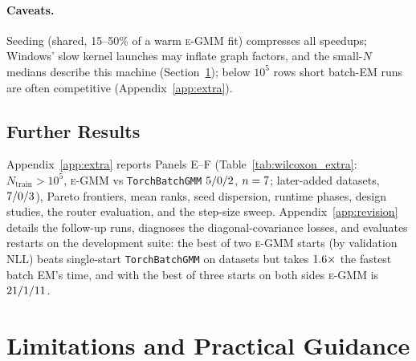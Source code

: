 \documentclass[10pt]{article} %
\newcommand{\egmm}{\textsc{e-GMM}}
\begin{document}
\paragraph{Caveats.} Seeding (shared, 15--50\% of a warm \egmm{} fit) compresses all speedups; Windows' slow kernel launches may inflate graph factors, and the small-$N$ medians describe this machine (Section~\ref{sec:limitations}); below $10^5$ rows short batch-EM runs are often competitive (Appendix~\ref{app:extra}).

\subsection{Further Results}

Appendix~\ref{app:extra} reports Panels E--F (Table~\ref{tab:wilcoxon_extra}: $N_{\mathrm{train}} > 10^5$, \egmm{} vs \texttt{TorchBatchGMM} $5/0/2$, $n = 7$; later-added datasets, $7/0/3$), Pareto frontiers, mean ranks, seed dispersion, runtime phases, design studies, the router evaluation, and the step-size sweep. Appendix~\ref{app:revision} details the follow-up runs, diagnoses the diagonal-covariance losses, and evaluates restarts on the development suite: the best of two \egmm{} starts (by validation NLL) beats single-start \texttt{TorchBatchGMM} on \rXReDevTwoWTL{} datasets but takes $1.6\times$ the fastest batch EM's time, and with the best of three starts on both sides \egmm{} is $21/1/11$.

\section{Limitations and Practical Guidance}
\label{sec:limitations}
\end{document}
